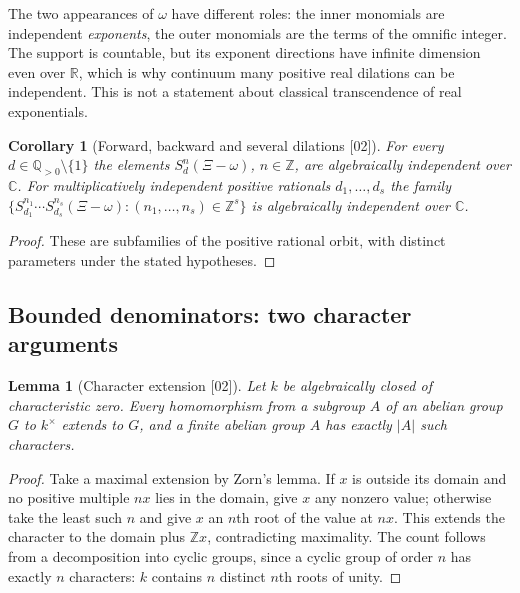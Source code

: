 \documentclass[11pt,letterpaper]{article}
\numberwithin{equation}{section}
\newtheorem{lemma}[lemma]{Lemma}
\newtheorem{corollary}[corollary]{Corollary}
\theoremstyle{definition}
\theoremstyle{remark}
\newcommand{\C}{\mathbb C}
\newcommand{\R}{\mathbb R}
\newcommand{\Q}{\mathbb Q}
\newcommand{\Z}{\mathbb Z}
\newcommand{\abs}[1]{\lvert#1\rvert}
\newcommand{\src}[1]{\textup{[#1]}}%
\begin{document}
The two appearances of $\omega$ have different roles: the inner monomials are
independent \emph{exponents}, the outer monomials are the terms of the omnific
integer. The support is countable, but its exponent directions have infinite
dimension even over $\R$, which is why continuum many positive real dilations
can be independent. This is not a statement about classical transcendence of
real exponentials.

\begin{corollary}[Forward, backward and several dilations \src{02}]
\label{adr:sr:cor:shifts}
For every $d\in\Q_{>0}\setminus\{1\}$ the elements $S_d^n(\Xi-\omega)$,
$n\in\Z$, are algebraically independent over $\C$. For multiplicatively
independent positive rationals $d_1,\ldots,d_s$ the family
$\{S_{d_1}^{n_1}\cdots S_{d_s}^{n_s}(\Xi-\omega):(n_1,\ldots,n_s)\in\Z^s\}$ is
algebraically independent over $\C$.
\end{corollary}
\begin{proof}
These are subfamilies of the positive rational orbit, with distinct
parameters under the stated hypotheses.
\end{proof}

\subsection{Bounded denominators: two character arguments}

\begin{lemma}[Character extension \src{02}]
\label{adr:sr:lem:characters}
Let $k$ be algebraically closed of characteristic zero. Every homomorphism
from a subgroup $A$ of an abelian group $G$ to $k^\times$ extends to $G$, and a
finite abelian group $A$ has exactly $\abs{A}$ such characters.
\end{lemma}
\begin{proof}
Take a maximal extension by Zorn's lemma. If $x$ is outside its domain and no
positive multiple $nx$ lies in the domain, give $x$ any nonzero value;
otherwise take the least such $n$ and give $x$ an $n$th root of the value at
$nx$. This extends the character to the domain plus $\Z x$, contradicting
maximality. The count follows from a decomposition into cyclic groups, since a
cyclic group of order $n$ has exactly $n$ characters: $k$ contains $n$
distinct $n$th roots of unity.
\end{proof}
\end{document}
